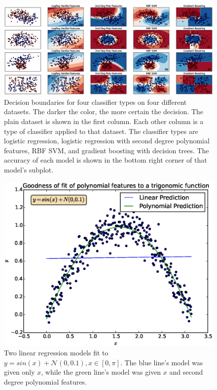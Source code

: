 \documentclass[11pt,twocolumn]{article}
\begin{document}
\begin{figure}
    \centering
    \includegraphics[scale=0.25]{boundaries.eps}
    
     \caption{\footnotesize{Decision boundaries for four classifier types on four different datasets. The darker the color, the more certain the decision.
             The plain dataset is shown in the first column. Each other column is a type of classifier applied to that dataset. The classifier
             types are logistic regression, logistic regression with second degree polynomial features, RBF SVM, and gradient boosting with decision trees.
             The accuracy of each model is shown in the bottom right corner of that model's subplot.}}
    \label{fig:boundaries}
\end{figure}

\begin{figure}
    \centering
    \includegraphics[scale=0.4]{regression.eps}
     \caption{\footnotesize{Two linear regression models fit to $y=sin(x) + \mathcal{N}(0, 0.1), x \in [0, \pi]$. The blue line's model was given only $x$, while the green line's model was given $x$ and second degree polynomial features.}}
    \label{fig:regression}
\end{figure}
\end{document}
